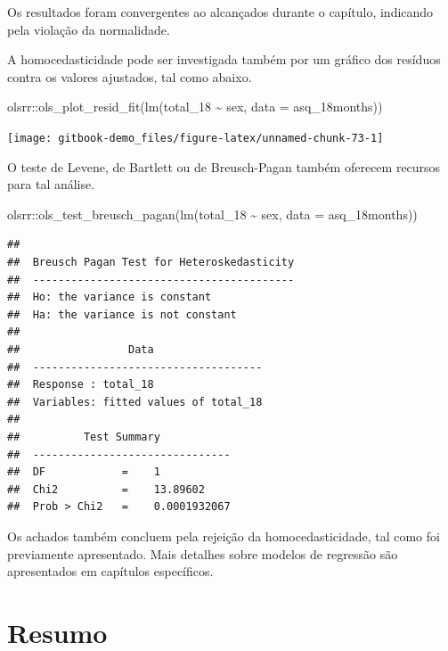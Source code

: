 \documentclass[
]{book}
\newenvironment{Shaded}{\begin{snugshade}}{\end{snugshade}}
\newcommand{\AttributeTok}[1]{\textcolor[rgb]{0.77,0.63,0.00}{#1}}
\newcommand{\FunctionTok}[1]{\textcolor[rgb]{0.00,0.00,0.00}{#1}}
\newcommand{\NormalTok}[1]{#1}
\newcommand{\SpecialCharTok}[1]{\textcolor[rgb]{0.00,0.00,0.00}{#1}}
\begin{document}
Os resultados foram convergentes ao alcançados durante o capítulo, indicando pela violação da normalidade.

A homocedasticidade pode ser investigada também por um gráfico dos resíduos contra os valores ajustados, tal como abaixo.

\begin{Shaded}
\begin{Highlighting}[]
\NormalTok{olsrr}\SpecialCharTok{::}\FunctionTok{ols\_plot\_resid\_fit}\NormalTok{(}\FunctionTok{lm}\NormalTok{(total\_18 }\SpecialCharTok{\textasciitilde{}}\NormalTok{ sex, }\AttributeTok{data =}\NormalTok{ asq\_18months))}
\end{Highlighting}
\end{Shaded}

\begin{center}\texttt{[image: gitbook-demo\_files/figure-latex/unnamed-chunk-73-1]} \end{center}

O teste de Levene, de Bartlett ou de Breusch-Pagan também oferecem recursos para tal análise.

\begin{Shaded}
\begin{Highlighting}[]
\NormalTok{olsrr}\SpecialCharTok{::}\FunctionTok{ols\_test\_breusch\_pagan}\NormalTok{(}\FunctionTok{lm}\NormalTok{(total\_18 }\SpecialCharTok{\textasciitilde{}}\NormalTok{ sex, }\AttributeTok{data =}\NormalTok{ asq\_18months))}
\end{Highlighting}
\end{Shaded}

\begin{verbatim}
## 
##  Breusch Pagan Test for Heteroskedasticity
##  -----------------------------------------
##  Ho: the variance is constant            
##  Ha: the variance is not constant        
## 
##                 Data                 
##  ------------------------------------
##  Response : total_18 
##  Variables: fitted values of total_18 
## 
##          Test Summary           
##  -------------------------------
##  DF            =    1 
##  Chi2          =    13.89602 
##  Prob > Chi2   =    0.0001932067
\end{verbatim}

Os achados também concluem pela rejeição da homocedasticidade, tal como foi previamente apresentado. Mais detalhes sobre modelos de regressão são apresentados em capítulos específicos.

\hypertarget{resumo-8}{%
\section{Resumo}\label{resumo-8}}
\end{document}
